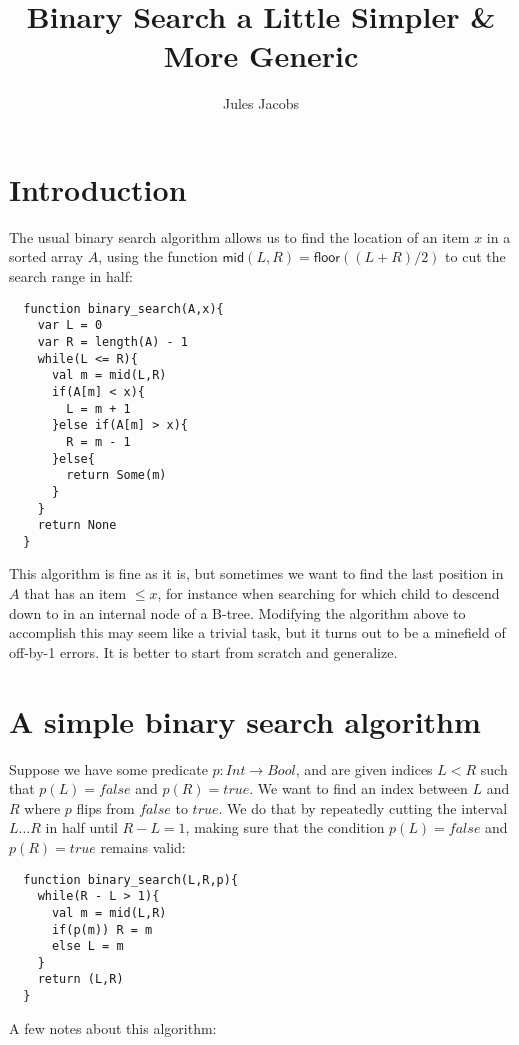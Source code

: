 \documentclass[a4paper, 11pt]{article}
\title{Binary Search a Little Simpler \& More Generic}
\author{Jules Jacobs}
\begin{document}
\maketitle

\section{Introduction}

The usual binary search algorithm allows us to find the location of an item $x$ in a sorted array $A$, using the function $\mathsf{mid}(L,R) = \mathsf{floor}((L+R)/2)$ to cut the search range in half:

\begin{lstlisting}
  function binary_search(A,x){
    var L = 0
    var R = length(A) - 1
    while(L <= R){
      val m = mid(L,R)
      if(A[m] < x){
        L = m + 1
      }else if(A[m] > x){
        R = m - 1
      }else{
        return Some(m)
      }
    }
    return None
  }
\end{lstlisting}

This algorithm is fine as it is, but sometimes we want to find the last position in $A$ that has an item $\leq x$, for instance when searching for which child to descend down to in an internal node of a B-tree. Modifying the algorithm above to accomplish this may seem like a trivial task, but it turns out to be a minefield of off-by-1 errors. It is better to start from scratch and generalize.

\section{A simple binary search algorithm}

Suppose we have some predicate $p : Int \to Bool$, and are given indices $L < R$ such that $p(L) = false$ and $p(R) = true$. We want to find an index between $L$ and $R$ where $p$ flips from $false$ to $true$. We do that by repeatedly cutting the interval $L\dots R$ in half until $R - L = 1$, making sure that the condition $p(L) = false$ and $p(R) = true$ remains valid:

\begin{lstlisting}
  function binary_search(L,R,p){
    while(R - L > 1){
      val m = mid(L,R)
      if(p(m)) R = m
      else L = m
    }
    return (L,R)
  }
\end{lstlisting}

\noindent A few notes about this algorithm:
\end{document}
